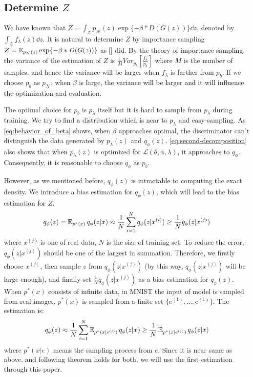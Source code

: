 \subsection{Determine $Z$}\label{subsec:determine_z}

We have known that $Z = \int_{\mathcal{Z}} p_\mathcal{N}(z) \exp\{- \beta * D(G(z))\} \dd z$, denoted by $\int_{\mathcal{Z}} f_\lambda(z) \dd z$. It is natural to determine $Z$ by importance sampling $Z = \operatorname{\mathbb{E}}_{p_\mathcal{N}(z)} \exp\{- \beta * D(G(z))\}$ as [] did. By the theory of importance sampling, the variance of the estimation of $Z$ is $\frac{1}{M} Var_{p_b}[\frac{f_\lambda}{p_b}]$ where $M$ is the number of samples. and hence the variance will be larger when $f_\lambda$ is farther from $p_b$. If we choose $p_b$ as $p_\mathcal{N}$, when $\beta$ is large, the variance will be larger and it will influence the optimization and evaluation. 

The optimal choice for $p_b$ is $p_\lambda$ itself but it is hard to sample from $p_\lambda$ during training. We try to find a distribution which is near to $p_\lambda$ and easy-sampling. As \cref{eq:behavior_of_beta} shows, when $\beta$ approaches optimal, the discriminator can't distinguish the data generated by $p_\lambda(z)$ and $q_\phi(z)$.  \cref{eq:second-decomposition} also shows that when $p_\lambda(z)$ is optimized for $\mathcal{L}(\theta, \phi, \lambda)$, it approaches to $q_\phi$. Consequently, it is reasonable to choose $q_\phi$ as $p_b$. 

However, as we mentioned before, $q_\phi(z)$ is intractable to computing the exact density. We introduce a bias estimation for $q_\phi(z)$, which will lead to the bias estimation for $Z$. 
\begin{equation*}
	q_\phi(z) = \operatorname{\mathbb{E}}_{p^*(x)} q_\phi(z|x) \approx \frac{1}{N}\sum_{i=1}^N q_\phi(z|x^{(i)}) \geq \frac{1}{N} q_\phi(z|x^{(j)})
\end{equation*}
where $x^{(j)}$ is one of real data, $N$ is the size of training set. To reduce the error, $q_\phi(z|x^{(j)})$ should be one of the largest in summation. Therefore, we firstly choose $x^{(j)}$, then sample $z$ from $q_\phi(z|x^{(j)})$ (by this way, $q_\phi(z|x^{(j)})$ will be large enough), and finally set $\frac{1}{N} q_\phi(z|x^{(j)})$ as a bias estimation for $q_\phi(z)$. When $p^*(x)$ consists of infinite data, \EG in MNIST the input of model is sampled from real images, $p^*(x)$ is sampled from a finite set $\{e^{(1)}, \ldots, e^{(1)}\}$. The estimation is:
\begin{equation*}
	q_\phi(z) \approx \frac{1}{N}\sum_{i=1}^N \operatorname{\mathbb{E}}_{p^*(x|e^{(j)})} q_\phi(z|x) \geq \frac{1}{N} \operatorname{\mathbb{E}}_{p^*(x|e^{(j)})} q_\phi(z|x)
\end{equation*} 
where $p^*(x|e)$ means the sampling process from $e$. Since it is near same as above, and following theorem holds for both, we will use the first estimation through this paper. 

